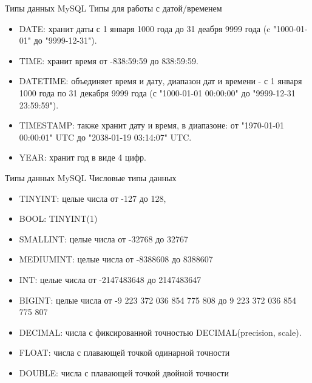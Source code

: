 \documentclass{beamer}
\begin{document}
\begin{frame}{Типы данных MySQL}
Типы для работы с датой/временем
\begin{itemize}
\item DATE: хранит даты с 1 января 1000 года до 31 деабря 9999 года (c "1000-01-01" до "9999-12-31"). 
\item TIME: хранит время от -838:59:59 до 838:59:59. 
\item DATETIME: объединяет время и дату, диапазон дат и времени - с 1 января 1000 года по 31 декабря 9999 года (с "1000-01-01 00:00:00" до "9999-12-31 23:59:59"). 
\item TIMESTAMP: также хранит дату и время, в диапазоне: от "1970-01-01 00:00:01" UTC до "2038-01-19 03:14:07" UTC. 
\item YEAR: хранит год в виде 4 цифр. 
\end{itemize}
\end{frame}

\begin{frame}{Типы данных MySQL}
Числовые типы данных
\begin{itemize}
\item TINYINT: целые числа от -127 до 128, 
\item BOOL: TINYINT(1) 
\item SMALLINT:  целые числа от -32768 до 32767
\item MEDIUMINT: целые числа от -8388608 до 8388607
\item INT: целые числа от -2147483648 до 2147483647
\item BIGINT: целые числа от -9 223 372 036 854 775 808 до 9 223 372 036 854 775 807
\item DECIMAL: числа с фиксированной точностью DECIMAL(precision, scale).
\item FLOAT: числа с плавающей точкой одинарной точности
\item DOUBLE: числа с плавающей точкой двойной точности 
\end{itemize}
\end{frame}
\end{document}
